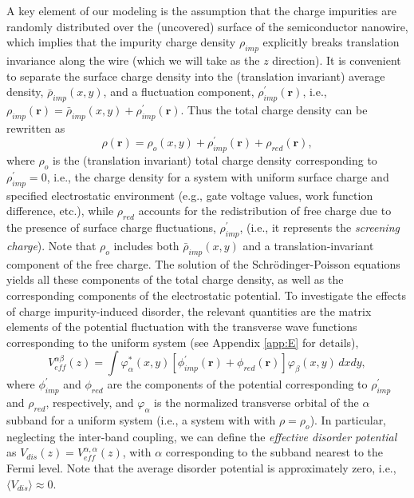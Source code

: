 \documentclass[aps,prmaterials,twocolumn,superscriptaddress,longbibliography]{revtex4-2}
\begin{document}
A key element of our modeling is the assumption that the charge impurities are randomly distributed over the (uncovered) surface of the semiconductor nanowire, which implies that the impurity charge density $\rho_{imp}$ explicitly breaks translation invariance along the wire (which we will take as the $z$ direction). It is convenient to separate the surface charge density into the (translation invariant) average density, $\bar{\rho}_{imp}(x,y)$, and a fluctuation component, $\rho_{imp}^\prime(\mathbf{r})$, i.e., $ \rho_{imp}(\mathbf{r}) = \bar{\rho}_{imp}(x,y) + \rho_{imp}^\prime(\mathbf{r})$. Thus the total charge density can be rewritten as 
\begin{equation}
    \rho(\mathbf{r}) = \rho_o(x,y) + \rho_{imp}^\prime(\mathbf{r}) + \rho_{red}(\mathbf{r}),
\end{equation}
where $\rho_o$ is the (translation invariant) total charge density corresponding to $\rho_{imp}^\prime = 0$, i.e., the charge density for a system with uniform surface charge and specified electrostatic environment (e.g., gate voltage values, work function difference, etc.), while $\rho_{red}$ accounts for the redistribution of free charge due to the presence of surface charge fluctuations, $\rho_{imp}^\prime$, (i.e., it represents the {\em screening charge}).
Note that $\rho_o$ includes both $\bar{\rho}_{imp}(x,y)$ and a translation-invariant component of the free charge. The solution of the Schr{\"o}dinger-Poisson equations yields all these components of the total charge density, as well as the corresponding components of the electrostatic potential. To investigate the effects of charge impurity-induced disorder, the relevant quantities are the matrix elements of the potential fluctuation with the transverse wave functions corresponding to the uniform system  (see Appendix \ref{app:E} for details), 
\begin{equation}
    V_{eff}^{\alpha \beta}(z) = 
    \int \varphi_{\alpha}^*(x,y)
    \left[
    \phi_{imp}^\prime(\mathbf{r}) 
    + \phi_{red}(\mathbf{r}) 
    \right]
    \varphi_{\beta}(x,y) \, dxdy, \label{EffPot0}
\end{equation}
where $\phi_{imp}^\prime$ and $\phi_{red}$ are the components of the potential corresponding to $ \rho_{imp}^\prime$ and $\rho_{red}$, respectively, and $\varphi_{\alpha}$ is the normalized transverse orbital of the $\alpha$ subband for a uniform system (i.e., a system with with  $\rho = \rho_o$). In particular, neglecting the inter-band coupling, we can define the {\em effective disorder potential} as  $ V_{dis}(z) = V_{eff}^{\alpha,\alpha}(z)$, with $\alpha$ corresponding to the subband nearest to the Fermi level.  Note that the average disorder potential is approximately zero, i.e., $\langle V_{dis} \rangle \approx 0$.
\end{document}
